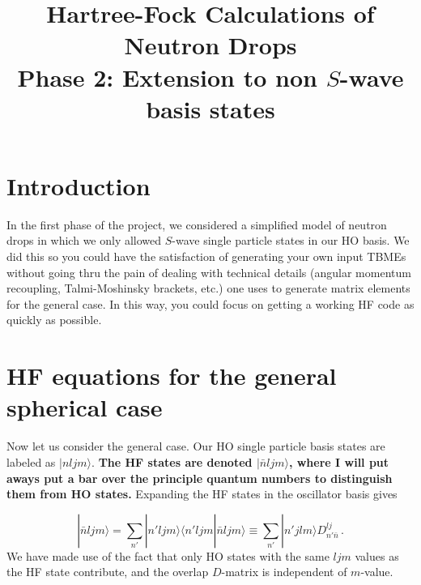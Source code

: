 \documentclass[letterpaper,12pt]{article}
\begin{document}
\title{Hartree-Fock Calculations of Neutron Drops\\
\Large{Phase 2: Extension to non $S$-wave basis states
}}
\maketitle



\section{Introduction}

In the first phase of the project, we considered a simplified model of neutron drops in which we only allowed $S$-wave single particle states in our HO basis. We did this so you could have the satisfaction of generating your own input TBMEs without going thru the pain of dealing with technical details (angular momentum recoupling, Talmi-Moshinsky brackets, etc.) one uses to generate matrix elements for the general case.  In this way, you could focus on getting a working HF code as quickly as possible. 


\section{HF equations for the general spherical case}

Now let us consider the general case. Our HO single particle basis  states are labeled as $|nljm\rangle$.  {\bf The HF states are denoted $|\bar{n}ljm\rangle$, where I will put aways put a bar over the principle quantum numbers to distinguish them from HO states.}  Expanding the HF states in the oscillator basis gives

\begin{equation}
|\bar{n}ljm\rangle =\sum_{n'}|n'ljm\rangle\langle n'ljm|\bar{n}ljm\rangle \equiv \sum_{n'} |n'jlm\rangle D^{lj}_{n'\bar{n}} \,.
\end{equation}
We have made use of the fact that only HO states with the same $ljm$ values as the HF state contribute, and the overlap $D$-matrix is independent of $m$-value.  
\end{document}
